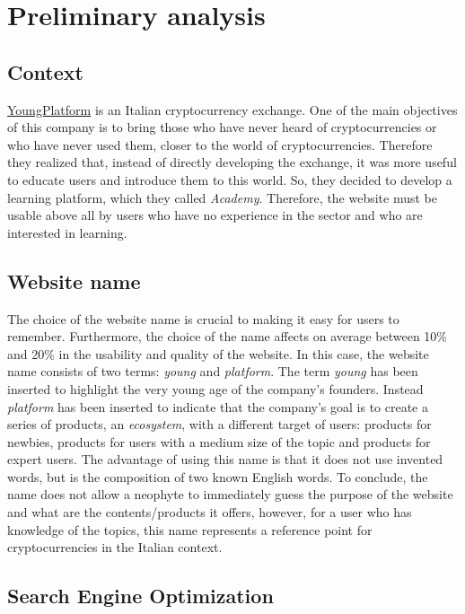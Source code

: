 \section{Preliminary analysis}

\subsection{Context}

\href{https://youngplatform.com}{YoungPlatform} is an Italian cryptocurrency 
exchange. One of the main objectives of this company is to bring those who 
have never heard of cryptocurrencies or who have never used them, closer to 
the world of cryptocurrencies. Therefore they realized that, instead of 
directly developing the exchange, it was more useful to educate users and 
introduce them to this world. So, they decided to develop a learning 
platform, which they called \textit{Academy}. Therefore, the website must 
be usable above all by users who have no experience in the sector and who 
are interested in learning.

\subsection{Website name}

The choice of the website name is crucial to making it easy for users to 
remember. Furthermore, the choice of the name affects on average between 
10\% and 20\% in the usability and quality of the website. In this case, 
the website name consists of two terms: \textit{young} and 
\textit{platform}. The term \textit{young} has been inserted to highlight 
the very young age of the company's founders. Instead \textit{platform} 
has been inserted to indicate that the company's goal is to create a 
series of products, an \textit{ecosystem}, with a different target of 
users: products for newbies, products for users with a medium size of 
the topic and products for expert users. The advantage of using this 
name is that it does not use invented words, but is the composition of 
two known English words. To conclude, the name does not allow a 
neophyte to immediately guess the purpose of the website and what are 
the contents/products it offers, however, for a user who has knowledge 
of the topics, this name represents a reference point for cryptocurrencies 
in the Italian context.

\subsection{Search Engine Optimization}

